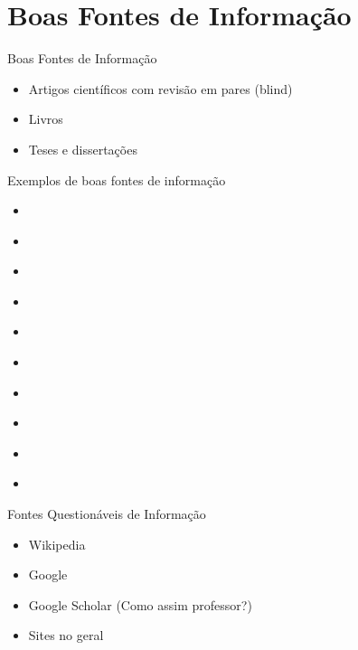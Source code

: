 \section{Boas Fontes de Informação}

\begin{frame}	
	\begin{block}{Boas Fontes de Informação}	
		\begin{itemize}
			\item Artigos científicos com revisão em pares (blind)
			\item Livros
			\item Teses e dissertações
		\end{itemize}
	\end{block}
\end{frame}

\begin{frame}	
	\begin{block}{Exemplos de boas fontes de informação}	
		\begin{itemize}
			\item \href{https://www.jstor.org}{\color{blue}{JStor}} 
			\item \href{https://ieeexplore.ieee.org/Xplore/home.jsp}{\color{blue}{IEEExplore}} 
			\item \href{https://dl.acm.org}{\color{blue}{ACMDL}} 
			\item \href{https://www.scopus.com/home.uri}{\color{blue}{Scopus}} 
			\item \href{https://link.springer.com}{\color{blue}{Springer}} 
			\item \href{https://www.sciencedirect.com}{\color{blue}{ScienceDirect}} 
			\item \href{http://www.scielo.br/?lng=pt}{\color{blue}{Scielo}} 
			\item \href{http://www.periodicos.capes.gov.br}{\color{blue}{CAPES}} 
			\item \href{http://www.bibliotecadigital.unicamp.br}{\color{blue}{Teses Unicamp}} 
			\item \href{http://www.teses.usp.br}{\color{blue}{Teses USP}} 
		\end{itemize}
	\end{block}
\end{frame}

\begin{frame}	
	\begin{block}{Fontes Questionáveis de Informação}	
		\begin{itemize}
			\item Wikipedia
			\item Google
			\item Google Scholar (Como assim professor?)
			\item Sites no geral 
		\end{itemize}
	\end{block}
\end{frame}

